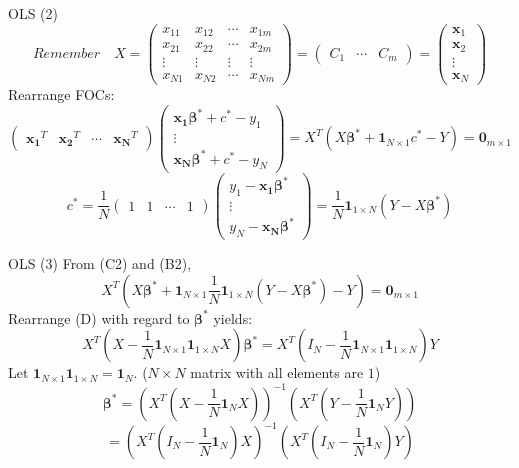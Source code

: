 \documentclass[a4paper,11pt]{article}
\newcommand{\bd}{\mathbf}
\begin{document}
\begin{frame}[t]{OLS (2)}
	\[
		Remember \quad X = \begin{pmatrix}
			x_{11} & x_{12} & \cdots & x_{1m}\\
			x_{21} & x_{22} & \cdots & x_{2m}\\
			\vdots & \vdots & \vdots & \vdots\\
			x_{N1} & x_{N2} & \cdots & x_{Nm}
		\end{pmatrix}  = \begin{pmatrix}
			C_1 & \cdots & C_m
		\end{pmatrix}=\begin{pmatrix}
			\bd{x}_1 \\ \bd{x}_2 \\ \vdots \\ \bd{x}_N
		\end{pmatrix}
	\]
	Rearrange FOCs:%
	\[
		\begin{pmatrix}
			\bd{x_1}^T & \bd{x_2}^T & \cdots & \bd{x_N}^T
		\end{pmatrix}\begin{pmatrix}
			\bd{x_1}\bd{\beta^\ast}+c^\ast-y_1 \\\vdots\\\bd{x_N}\bd{\beta^\ast}+c^\ast-y_N
		\end{pmatrix} = X^T (X\bd{\beta^\ast}+\bd{1}_{N\times 1}c^\ast-Y)=\bd{0}_{m\times 1} \tag{B2}
	\]\[
		c^\ast = \frac{1}{N}\begin{pmatrix}
			1 & 1 & \cdots & 1
		\end{pmatrix}\begin{pmatrix}
			y_1 - \bd{x_1}\bd{\beta^\ast} \\\vdots\\y_N - \bd{x_N}\bd{\beta^\ast}
		\end{pmatrix}=\frac{1}{N}\bd{1}_{1\times N}(Y-X\bd{\beta^\ast})\tag{C2}
	\]
\end{frame}
\begin{frame}[t]{OLS (3)}
	From (C2) and (B2),\[
		X^T\left(X\bd{\beta^\ast}+\bd{1}_{N\times 1}\frac{1}{N}\bd{1}_{1\times N}(Y-X\bd{\beta^\ast})-Y\right) = \bd{0}_{m\times 1}\tag{D}
	\]
	Rearrange (D) with regard to $\bd{\beta^\ast}$ yields:
	\[
		X^T(X - \frac{1}{N}\bd{1}_{N\times 1}\bd{1}_{1\times N}X)\bd{\beta^\ast}= X^T(I_N-\frac{1}{N}\bd{1}_{N\times 1}\bd{1}_{1\times N})Y
	\]
	Let $\bd{1}_{N\times 1}\bd{1}_{1\times N} = \bd{1}_N$. ($N\times N$ matrix with all elements are $1$)
	\[
		\bd{\beta^\ast} = \left(X^T \left(X-\frac{1}{N}\bd{1}_{N} X\right)\right)^{-1}\left(X^T \left(Y - \frac{1}{N}\bd{1}_N Y\right)\right)
	\]\[
		=\left(X^T\left(I_N - \frac{1}{N}\bd{1}_N\right)X\right)^{-1}\left(X^T\left(I_N - \frac{1}{N}\bd{1}_N\right)Y\right)
	\]
\end{frame}
\end{document}

